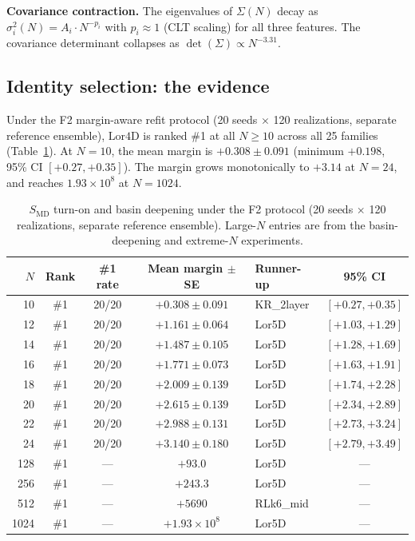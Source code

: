 \documentclass[12pt,a4paper]{article}
\newcommand{\SMD}{S_{\mathrm{MD}}}
\newcommand{\Lor}{\mathrm{Lor4D}}
\begin{document}
\textbf{Covariance contraction.}
The eigenvalues of $\Sigma(N)$ decay as $\sigma_i^2(N) = A_i\cdot N^{-p_i}$
with $p_i\approx 1$ (CLT scaling) for all three features.
The covariance determinant collapses as
$\det(\Sigma)\propto N^{-3.31}$.

\subsection{Identity selection: the evidence}

Under the F2 margin-aware refit protocol (20 seeds $\times$ 120 realizations,
separate reference ensemble), $\Lor$ is ranked \#1 at all $N\geq 10$ across all
25 families (Table~\ref{tab:turnon}).
At $N=10$, the mean margin is $+0.308\pm 0.091$ (minimum $+0.198$, 95\% CI
$[+0.27,+0.35]$).
The margin grows monotonically to $+3.14$ at $N=24$, and reaches
$1.93\times 10^8$ at $N=1024$.

\begin{table}[ht!]
\centering
\caption{$\SMD$ turn-on and basin deepening under the F2 protocol
(20 seeds $\times$ 120 realizations, separate reference ensemble).
Large-$N$ entries are from the basin-deepening and extreme-$N$ experiments.}
\label{tab:turnon}
\begin{tabular}{rccclc}
\toprule
$N$ & Rank & \#1 rate & Mean margin $\pm$ SE & Runner-up & 95\% CI \\
\midrule
10  & \#1 & 20/20 & $+0.308\pm 0.091$ & KR\_2layer & $[+0.27,+0.35]$ \\
12  & \#1 & 20/20 & $+1.161\pm 0.064$ & Lor5D      & $[+1.03,+1.29]$ \\
14  & \#1 & 20/20 & $+1.487\pm 0.105$ & Lor5D      & $[+1.28,+1.69]$ \\
16  & \#1 & 20/20 & $+1.771\pm 0.073$ & Lor5D      & $[+1.63,+1.91]$ \\
18  & \#1 & 20/20 & $+2.009\pm 0.139$ & Lor5D      & $[+1.74,+2.28]$ \\
20  & \#1 & 20/20 & $+2.615\pm 0.139$ & Lor5D      & $[+2.34,+2.89]$ \\
22  & \#1 & 20/20 & $+2.988\pm 0.131$ & Lor5D      & $[+2.73,+3.24]$ \\
24  & \#1 & 20/20 & $+3.140\pm 0.180$ & Lor5D      & $[+2.79,+3.49]$ \\
\midrule
128  & \#1 & --- & $+93.0$   & Lor5D   & --- \\
256  & \#1 & --- & $+243.3$  & Lor5D   & --- \\
512  & \#1 & --- & $+5690$   & RLk6\_mid & --- \\
1024 & \#1 & --- & $+1.93\times 10^8$ & Lor5D & --- \\
\bottomrule
\end{tabular}
\end{table}
\end{document}
